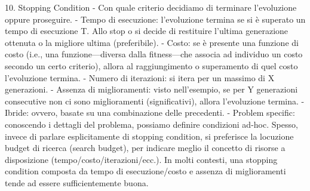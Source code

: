 \documentclass{article}
\begin{document}
    10. Stopping Condition - Con quale criterio decidiamo di terminare l’evoluzione oppure proseguire.
    - Tempo di esecuzione: l’evoluzione termina se si è superato un tempo di esecuzione T. Allo stop o si decide di restituire l’ultima generazione ottenuta o la
    migliore ultima (preferibile).
    - Costo: se è presente una funzione di costo (i.e., una funzione---diversa dalla fitness---che associa ad individuo un costo secondo un certo criterio),
    allora al raggiungimento o superamento di quel costo l’evoluzione termina.
    - Numero di iterazioni: si itera per un massimo di X generazioni.
    - Assenza di miglioramenti: visto nell’esempio, se per Y generazioni consecutive non ci sono miglioramenti (significativi), allora l’evoluzione termina.
    - Ibride: ovvero, basate su una combinazione delle precedenti.
    - Problem specific: conoscendo i dettagli del problema, possiamo definire condizioni ad-hoc.
    Spesso, invece di parlare esplicitamente di stopping condition, si preferisce la locuzione budget di ricerca (search budget), per indicare meglio il concetto
    di risorse a disposizione (tempo/costo/iterazioni/ecc.).
    In molti contesti, una stopping condition composta da tempo di esecuzione/costo e assenza di miglioramenti tende ad essere sufficientemente buona.
\end{document}
